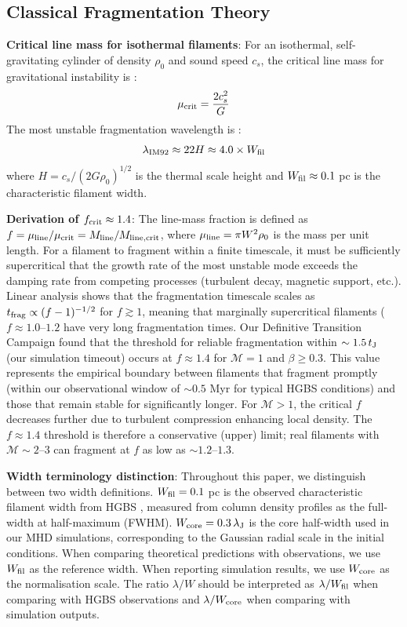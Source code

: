 \documentclass[twoside,twocolumn]{mnras}
\begin{document}
\subsection{Classical Fragmentation Theory}

\textbf{Critical line mass for isothermal filaments}: For an isothermal, self-gravitating cylinder of density $\rho_0$ and sound speed $c_s$, the critical line mass for gravitational instability is \citep{Ostriker1964}:
\begin{equation}
\mu_{\rm crit} = \frac{2c_s^2}{G}
\end{equation}
The most unstable fragmentation wavelength is \citep{Inutsuka1992}:
\begin{equation}
\lambda_{\rm IM92} \approx 22 H \approx 4.0 \times W_{\rm fil}
\label{eq:im92}
\end{equation}
where $H = c_s/(2G\rho_0)^{1/2}$ is the thermal scale height and $W_{\rm fil} \approx 0.1$ pc is the characteristic filament width.

\textbf{Derivation of $f_{\rm crit} \approx 1.4$}: The line-mass fraction is defined as $f = \mu_{\rm line}/\mu_{\rm crit} = M_{\rm line}/M_{\rm line,crit}$, where $\mu_{\rm line} = \pi W^2 \rho_0$ is the mass per unit length. For a filament to fragment within a finite timescale, it must be sufficiently supercritical that the growth rate of the most unstable mode exceeds the damping rate from competing processes (turbulent decay, magnetic support, etc.). Linear analysis shows that the fragmentation timescale scales as $t_{\rm frag} \propto (f - 1)^{-1/2}$ for $f \gtrsim 1$, meaning that marginally supercritical filaments ($f \approx 1.0$--$1.2$ have very long fragmentation times. Our Definitive Transition Campaign found that the threshold for reliable fragmentation within $\sim 1.5\,t_{\rm J}$ (our simulation timeout) occurs at $f \approx 1.4$ for $\mathcal{M} = 1$ and $\beta \geq 0.3$. This value represents the empirical boundary between filaments that fragment promptly (within our observational window of $\sim 0.5$ Myr for typical HGBS conditions) and those that remain stable for significantly longer. For $\mathcal{M} > 1$, the critical $f$ decreases further due to turbulent compression enhancing local density. The $f \approx 1.4$ threshold is therefore a conservative (upper) limit; real filaments with $\mathcal{M} \sim 2$--$3$ can fragment at $f$ as low as $\sim 1.2$--$1.3$.

\textbf{Width terminology distinction}: Throughout this paper, we distinguish between two width definitions. $W_{\rm fil} = 0.1$ pc is the observed characteristic filament width from HGBS \citep{Arzoumanian2011}, measured from column density profiles as the full-width at half-maximum (FWHM). $W_{\rm core} = 0.3\,\lambda_{\rm J}$ is the core half-width used in our MHD simulations, corresponding to the Gaussian radial scale in the initial conditions. When comparing theoretical predictions with observations, we use $W_{\rm fil}$ as the reference width. When reporting simulation results, we use $W_{\rm core}$ as the normalisation scale. The ratio $\lambda/W$ should be interpreted as $\lambda/W_{\rm fil}$ when comparing with HGBS observations and $\lambda/W_{\rm core}$ when comparing with simulation outputs.
\end{document}
